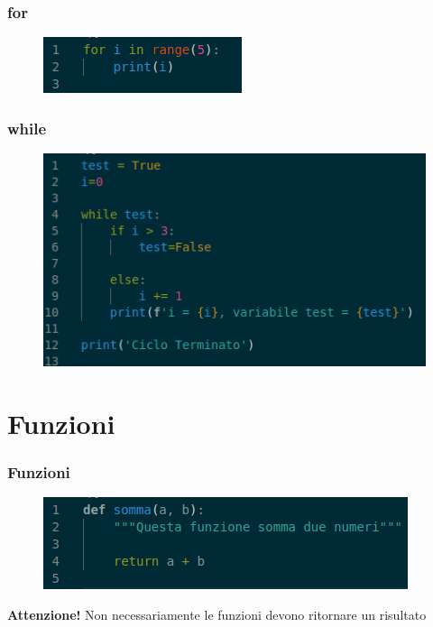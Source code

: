 \documentclass{beamer}
\begin{document}
\begin{frame}
    
    \frametitle{for}
    \begin{figure}
        \centering
        \includegraphics[width=1\linewidth]{for.png}
    \end{figure}

\end{frame}

\begin{frame}
    
    \frametitle{while}
    \begin{figure}
        \centering
        \includegraphics[width=1\linewidth]{while.png}
    \end{figure}

\end{frame}


\section{Funzioni}
\begin{frame}
    
    \frametitle{Funzioni}
    \begin{figure}
        \centering
        \includegraphics[width=1\linewidth]{funzioni.png}
    \end{figure}

    \textbf{Attenzione!} Non necessariamente le funzioni devono ritornare un risultato

\end{frame}
\end{document}
